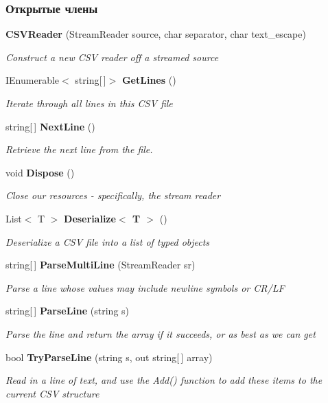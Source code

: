 \subsubsection*{Открытые члены}
\begin{DoxyCompactItemize}
\item 
{\bf C\+S\+V\+Reader} (Stream\+Reader source, char separator, char text\+\_\+escape)
\begin{DoxyCompactList}\small\item\em Construct a new C\+S\+V reader off a streamed source \end{DoxyCompactList}\item 
I\+Enumerable$<$ string[$\,$]$>$ {\bf Get\+Lines} ()
\begin{DoxyCompactList}\small\item\em Iterate through all lines in this C\+S\+V file \end{DoxyCompactList}\item 
string[$\,$] {\bf Next\+Line} ()
\begin{DoxyCompactList}\small\item\em Retrieve the next line from the file. \end{DoxyCompactList}\item 
void {\bf Dispose} ()
\begin{DoxyCompactList}\small\item\em Close our resources -\/ specifically, the stream reader \end{DoxyCompactList}\item 
List$<$ T $>$ {\bf Deserialize$<$ T $>$} ()
\begin{DoxyCompactList}\small\item\em Deserialize a C\+S\+V file into a list of typed objects \end{DoxyCompactList}\item 
string[$\,$] {\bf Parse\+Multi\+Line} (Stream\+Reader sr)
\begin{DoxyCompactList}\small\item\em Parse a line whose values may include newline symbols or C\+R/\+L\+F \end{DoxyCompactList}\item 
string[$\,$] {\bf Parse\+Line} (string s)
\begin{DoxyCompactList}\small\item\em Parse the line and return the array if it succeeds, or as best as we can get \end{DoxyCompactList}\item 
bool {\bf Try\+Parse\+Line} (string s, out string[$\,$] array)
\begin{DoxyCompactList}\small\item\em Read in a line of text, and use the Add() function to add these items to the current C\+S\+V structure \end{DoxyCompactList}\end{DoxyCompactItemize}


